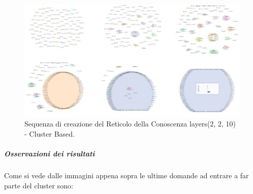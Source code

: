 \begin{figure}[H]
\centering
	\includegraphics[width=0.70\linewidth]{./image/collage_reticolo-sql(2,2,10).png}
	\caption{Sequenza di creazione del Reticolo della Conoscenza layers(2, 2, 10) - Cluster Based.}
	\label{Sequenza di creazione del Reticolo della Conoscenza layers(2, 2, 10) - Cluster Based.}
\end{figure}
\noindent
\subparagraph{Osservazioni dei risultati}\mbox{}
\noindent
Come si vede dalle immagini appena sopra le ultime domande ad entrare a far parte del cluster sono:

